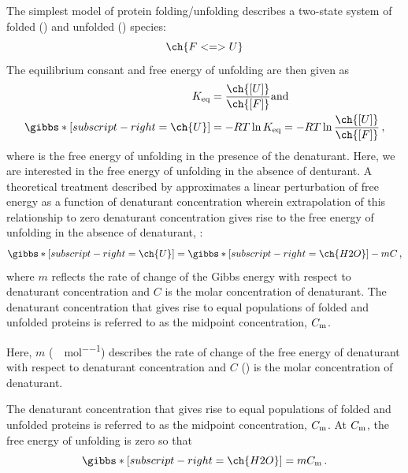 \documentclass[nobib,nofonts,nols,nohyper]{tufte-handout}
\begin{document}
The simplest model of protein folding/unfolding describes a two-state system of folded () and unfolded () species:
\begin{equation}
  \ch{F <=> U} 
\end{equation}
The equilibrium consant and free energy of unfolding are then given as 
\begin{align}
  K_\mtext{eq} &= \frac{\ch{[U]}}{\ch{[F]}}  \mtext{and} \\
  {}\gibbs*[subscript-right=\ch{U}]{} &= -RT \ln{K_\mtext{eq}} = -RT \ln{\frac{\ch{[U]}}{\ch{[F]}}} \, ,
\end{align}
where \gibbs*[subscript-right=\ch{U}]{} is the free energy of unfolding in the presence of the denaturant. 
Here, we are interested in the free energy of unfolding in the absence of denturant. 
A theoretical treatment described by \textcite{pace86,jones97} approximates a linear perturbation of free energy as a function of denaturant concentration wherein extrapolation of this relationship to zero denaturant concentration gives rise to the free energy of unfolding in the absence of denaturant, \gibbs*[subscript-right=\ch{H2O}]{}:
\begin{equation}
  \gibbs*[subscript-right=\ch{U}]{} = \gibbs*[subscript-right=\ch{H2O}]{} - m C \, ,
\end{equation}
where \( m \) reflects the rate of change of the Gibbs energy with respect to denaturant concentration and \( C \) is the molar concentration of denaturant. 
The denaturant concentration that gives rise to equal populations of folded and unfolded proteins is referred to as the midpoint concentration, \( C_{\textnormal{m}} \). 

Here, \( m \) (\si{\kcal\per\Molar\per\mole}) describes the rate of change of the free energy of denaturant with respect to denaturant concentration and \( C \) (\si{\Molar}) is the molar concentration of denaturant.  

The denaturant concentration that gives rise to equal populations of folded and unfolded proteins is referred to as the midpoint concentration, \( C_{\textnormal{m}} \).  At \( C_{\textnormal{m}} \), the free energy of unfolding is zero so that
\begin{equation}
  \gibbs*[subscript-right=\ch{H2O}]{} = m C_\mtext{m} \, .
  \label{eq:gibbs_h2o}
\end{equation}
\end{document}
